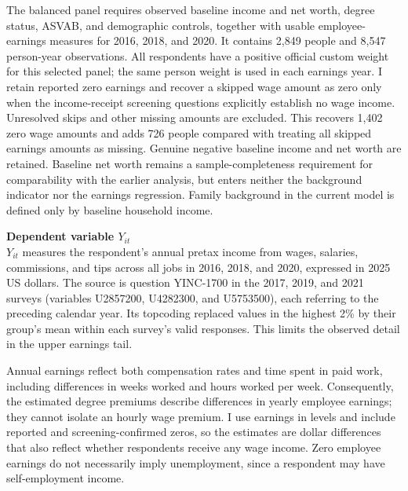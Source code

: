 \documentclass[12pt,letterpaper]{article}
\begin{document}
The balanced panel requires observed baseline income and net worth, degree status,
ASVAB, and demographic controls, together with usable employee-earnings measures
for 2016, 2018, and 2020. It contains 2,849 people and 8,547 person-year observations.
All respondents have a positive official custom weight for this selected panel;
the same person weight is used in each earnings year. I retain reported zero earnings and
recover a skipped wage amount as zero only when the income-receipt screening
questions explicitly establish no wage income. Unresolved skips and other missing
amounts are excluded. This recovers 1,402 zero wage amounts and adds 726 people
compared with treating all skipped earnings amounts as missing. Genuine negative baseline income and net worth
are retained. Baseline net worth remains a sample-completeness requirement for
comparability with the earlier analysis, but enters neither the background indicator
nor the earnings regression. Family background in the current model is defined
only by baseline household income.\newline

\textbf{Dependent variable $Y_{it}$}\\
$Y_{it}$ measures the respondent's annual pretax income from wages, salaries,
commissions, and tips across all jobs in 2016, 2018, and 2020, expressed in 2025
US dollars. The source is question YINC-1700 in the 2017, 2019, and 2021 surveys
(variables U2857200, U4282300, and U5753500), each referring to the preceding
calendar year. Its topcoding replaced values in the highest 2\% by 
their group's mean within each survey's valid responses. This limits the
 observed detail in the upper earnings tail.\newline

Annual earnings reflect both compensation rates and time spent in paid work,
including differences in weeks worked and hours worked per week. Consequently,
the estimated degree premiums describe differences in yearly employee earnings;
they cannot isolate an hourly wage premium. I use earnings in levels and include
reported and screening-confirmed zeros, so the estimates are dollar differences
that also reflect whether respondents receive any wage income. Zero employee earnings
do not necessarily imply unemployment, since a respondent may have self-employment
income.\newline
\end{document}
